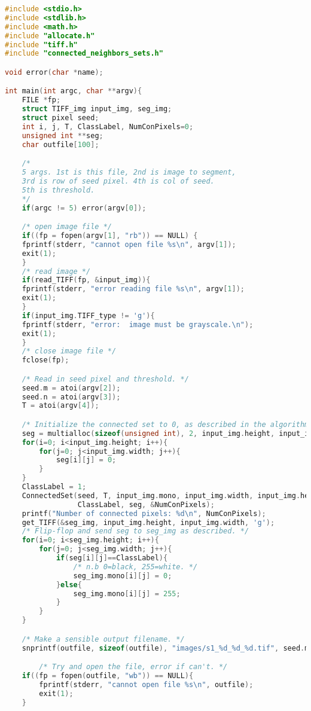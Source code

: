 \documentclass{article}
\begin{document}
\begin{lstlisting}[language=C, caption=sec\_1.c, label={lst:sec1}]
#include <stdio.h>
#include <stdlib.h>
#include <math.h>
#include "allocate.h"
#include "tiff.h"
#include "connected_neighbors_sets.h"

void error(char *name);

int main(int argc, char **argv){
    FILE *fp;
    struct TIFF_img input_img, seg_img;
    struct pixel seed;
    int i, j, T, ClassLabel, NumConPixels=0;
    unsigned int **seg;
    char outfile[100];

    /*
    5 args. 1st is this file, 2nd is image to segment,
    3rd is row of seed pixel. 4th is col of seed.
    5th is threshold.
    */
    if(argc != 5) error(argv[0]);

    /* open image file */
    if((fp = fopen(argv[1], "rb")) == NULL) {
    fprintf(stderr, "cannot open file %s\n", argv[1]);
    exit(1);
    }
    /* read image */
    if(read_TIFF(fp, &input_img)){
    fprintf(stderr, "error reading file %s\n", argv[1]);
    exit(1);
    }
    if(input_img.TIFF_type != 'g'){
    fprintf(stderr, "error:  image must be grayscale.\n");
    exit(1);
    }
    /* close image file */
    fclose(fp);

    /* Read in seed pixel and threshold. */
    seed.m = atoi(argv[2]);
    seed.n = atoi(argv[3]);
    T = atoi(argv[4]);

    /* Initialize the connected set to 0, as described in the algorithm */
    seg = multialloc(sizeof(unsigned int), 2, input_img.height, input_img.width);
    for(i=0; i<input_img.height; i++){
        for(j=0; j<input_img.width; j++){
            seg[i][j] = 0;
        }
    }
    ClassLabel = 1;
    ConnectedSet(seed, T, input_img.mono, input_img.width, input_img.height,
                 ClassLabel, seg, &NumConPixels);
    printf("Number of connected pixels: %d\n", NumConPixels);
    get_TIFF(&seg_img, input_img.height, input_img.width, 'g');
    /* Flip-flop and send seg to seg_img as described. */
    for(i=0; i<seg_img.height; i++){
        for(j=0; j<seg_img.width; j++){
            if(seg[i][j]==ClassLabel){
                /* n.b 0=black, 255=white. */
                seg_img.mono[i][j] = 0;
            }else{
                seg_img.mono[i][j] = 255;
            }
        }
    }

    /* Make a sensible output filename. */
    snprintf(outfile, sizeof(outfile), "images/s1_%d_%d_%d.tif", seed.m, seed.n, T);

        /* Try and open the file, error if can't. */
    if((fp = fopen(outfile, "wb")) == NULL){
        fprintf(stderr, "cannot open file %s\n", outfile);
        exit(1);
    }


\end{lstlisting}
\end{document}

